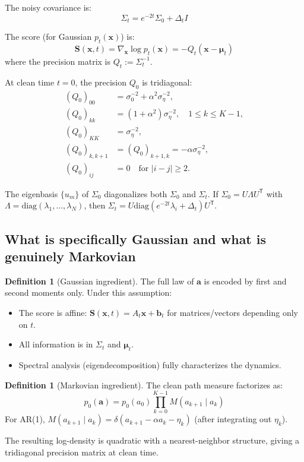 \documentclass[11pt,a4paper]{article}
\theoremstyle{plain}
\theoremstyle{definition}
\newtheorem{definition}[theorem]{Definition}
\newcommand{\Sig}{\Sigma}
\newcommand{\Prec}{Q}
\newcommand{\delt}{\Delta_t}
\newcommand{\vct}[1]{\mathbf{#1}}
\newcommand{\tr}{\mathsf{T}}
\begin{document}
The noisy covariance is:
\begin{equation}
\Sig_t = e^{-2t}\Sig_0 + \delt I
\end{equation}

The score (for Gaussian $p_t(\vct{x})$) is:
\begin{equation}
\vct{S}(\vct{x},t) = \nabla_{\vct{x}} \log p_t(\vct{x}) = -\Prec_t(\vct{x} - \boldsymbol{\mu}_t)
\end{equation}
where the precision matrix is $\Prec_t := \Sig_t^{-1}$.

At clean time $t=0$, the precision $\Prec_0$ is tridiagonal:
\begin{align}
(\Prec_0)_{00} &= \sigma_0^{-2} + \alpha^2 \sigma_\eta^{-2}, \\
(\Prec_0)_{kk} &= (1 + \alpha^2)\sigma_\eta^{-2}, \quad 1 \le k \le K-1, \\
(\Prec_0)_{KK} &= \sigma_\eta^{-2}, \\
(\Prec_0)_{k,k+1} &= (\Prec_0)_{k+1,k} = -\alpha \sigma_\eta^{-2}, \\
(\Prec_0)_{ij} &= 0 \quad \text{for } |i-j| \ge 2.
\end{align}

The eigenbasis $\{u_m\}$ of $\Sig_0$ diagonalizes both $\Sig_0$ and $\Sig_t$. If $\Sig_0 = U \Lambda U^\tr$ with $\Lambda = \text{diag}(\lambda_1, \ldots, \lambda_N)$, then $\Sig_t = U \text{diag}(e^{-2t}\lambda_i + \delt) U^\tr$.

\subsection{What is specifically Gaussian and what is genuinely Markovian}
\label{sec:gaussian-vs-markov}

\begin{definition}[Gaussian ingredient]
The full law of $\vct{a}$ is encoded by first and second moments only. Under this assumption:
\begin{itemize}
\item The score is affine: $\vct{S}(\vct{x}, t) = A_t \vct{x} + \vct{b}_t$ for matrices/vectors depending only on $t$.
\item All information is in $\Sig_t$ and $\boldsymbol{\mu}_t$.
\item Spectral analysis (eigendecomposition) fully characterizes the dynamics.
\end{itemize}
\end{definition}

\begin{definition}[Markovian ingredient]
The clean path measure factorizes as:
\begin{equation}
p_0(\vct{a}) = p_0(a_0) \prod_{k=0}^{K-1} M(a_{k+1} \mid a_k)
\end{equation}
For AR(1), $M(a_{k+1} \mid a_k) = \delta(a_{k+1} - \alpha a_k - \eta_k)$ (after integrating out $\eta_k$).

The resulting log-density is quadratic with a nearest-neighbor structure, giving a tridiagonal precision matrix at clean time.
\end{definition}
\end{document}
